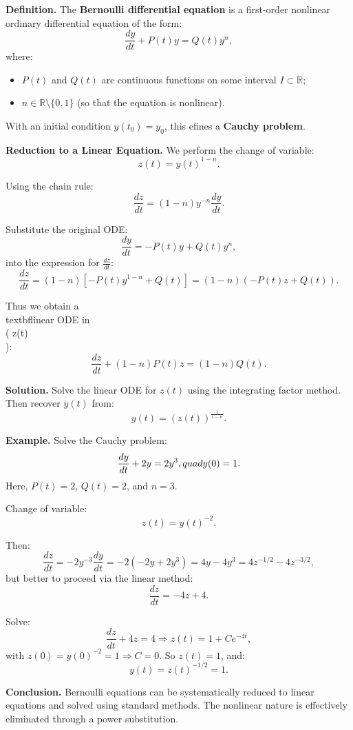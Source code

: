 
\textbf{Definition.} The \textbf{Bernoulli differential equation} is a first-order nonlinear ordinary differential equation of the form:
\[
\frac{dy}{dt} + P(t)y = Q(t)y^n,
\]
where:
\begin{itemize}
  \item \( P(t) \) and \( Q(t) \) are continuous functions on some interval \( I \subset \mathbb{R} \);
  \item \( n \in \mathbb{R} \setminus \{0,1\} \) (so that the equation is nonlinear).
\end{itemize}

With an initial condition \( y(t_0) = y_0 \), this efines a \textbf{Cauchy problem}.

\vspace{1em}
\textbf{Reduction to a Linear Equation.}  
We perform the change of variable:
\[
z(t) = y(t)^{1 - n}.
\]

Using the chain rule:
\[
\frac{dz}{dt} = (1 - n)y^{-n} \frac{dy}{dt}.
\]

Substitute the original ODE:
\[
\frac{dy}{dt} = -P(t)y + Q(t)y^n,
\]
into the expression for \( \frac{dz}{dt} \):
\[
\frac{dz}{dt} = (1 - n)\left[ -P(t)y^{1 - n} + Q(t) \right] = (1 - n)(-P(t)z + Q(t)).
\]

Thus we obtain a \\textbf{linear ODE in \\( z(t) \\)}:
\[
\frac{dz}{dt} + (1 - n)P(t)z = (1 - n)Q(t).
\]

\textbf{Solution.}  
Solve the linear ODE for \( z(t) \) using the integrating factor method. Then recover \( y(t) \) from:
\[
y(t) = \left(z(t)\right)^{\frac{1}{1 - n}}.
\]

\textbf{Example.} Solve the Cauchy problem:
\[
\frac{dy}{dt} + 2y = 2y^3, \\quad y(0) = 1.
\]
Here, \( P(t) = 2 \), \( Q(t) = 2 \), and \( n = 3 \).

Change of variable:
\[
z(t) = y(t)^{-2}.
\]

Then:
\[
\frac{dz}{dt} = -2y^{-3} \frac{dy}{dt} = -2( -2y + 2y^3 ) = 4y - 4y^3 = 4z^{-1/2} - 4z^{-3/2},
\]
but better to proceed via the linear method:
\[
\frac{dz}{dt} = -4z + 4.
\]

Solve:
\[
\frac{dz}{dt} + 4z = 4 \Rightarrow z(t) = 1 + Ce^{-4t},
\]
with \( z(0) = y(0)^{-2} = 1 \Rightarrow C = 0 \). So \( z(t) = 1 \), and:
\[
y(t) = z(t)^{-1/2} = 1.
\]

\textbf{Conclusion.} Bernoulli equations can be systematically reduced to linear equations and solved using standard methods. The nonlinear nature is effectively eliminated through a power substitution.
